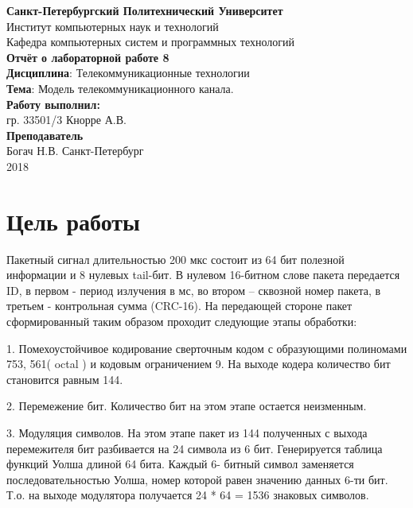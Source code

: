 \documentclass[a4paper,14pt]{extarticle}
\begin{document}
\begin{titlepage}
\centering 
{\bfseries Санкт-Петербургский Политехнический Университет} \\
Институт компьютерных наук и технологий \\
Кафедра компьютерных систем и программных технологий \\
\vspace{5cm}
{\centering \textbf{Отчёт о лабораторной работе 8} \\ 
\vspace{0.2cm}
\textbf{Дисциплина}: Телекоммуникационные технологии \\
\vspace{0.2cm}
\textbf{Тема}: Модель телекоммуникационного канала. } \\
\vspace{4cm}
\hfill {\bfseries Работу выполнил:}  \\
\hfill гр. 33501/3 Кнорре А.В. \\
\hfill {\bfseries Преподаватель}  \\
\hfill Богач Н.В.
\vfill
Санкт-Петербург \\
{\large 2018}
\end{titlepage}

\section{Цель работы}
Пакетный сигнал длительностью 200 мкс состоит из 64 бит полезной информации и 8 нулевых tail-бит. В нулевом 16-битном слове пакета передается ID, в первом - период излучения в мс, во втором – сквозной номер пакета, в третьем - контрольная сумма (CRC-16). На передающей стороне пакет сформированный таким образом проходит следующие этапы обработки: 

1. Помехоустойчивое кодирование сверточным кодом с образующими полиномами 753, 561( octal ) и кодовым ограничением 9. На выходе кодера количество бит становится равным 144. 

2. Перемежение бит. Количество бит на этом этапе остается неизменным. 

3. Модуляция символов. На этом этапе пакет из 144 полученных с выхода перемежителя бит разбивается на 24 символа из 6 бит. Генерируется таблица функций Уолша длиной 64 бита. Каждый 6- битный символ заменяется последовательностью Уолша, номер которой равен значению данных 6-ти бит. Т.о. на выходе модулятора получается 24 * 64 = 1536 знаковых символов. 
\end{document}

